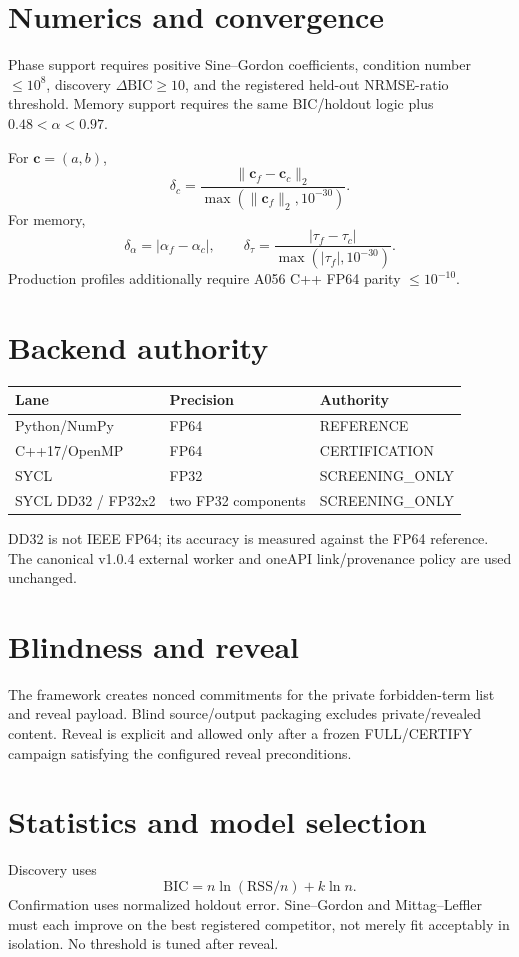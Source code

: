 \documentclass[11pt,a4paper]{article}
\begin{document}
\section{Numerics and convergence}
Phase support requires positive Sine--Gordon coefficients, condition number $\le 10^8$, discovery $\Delta\mathrm{BIC}\ge10$, and the registered held-out NRMSE-ratio threshold. Memory support requires the same BIC/holdout logic plus $0.48<\alpha<0.97$.

For $\mathbf c=(a,b)$,
\[
\delta_c=\frac{\|\mathbf c_f-\mathbf c_c\|_2}{\max(\|\mathbf c_f\|_2,10^{-30})}.
\]
For memory,
\[
\delta_\alpha=|\alpha_f-\alpha_c|,\qquad
\delta_\tau=\frac{|\tau_f-\tau_c|}{\max(|\tau_f|,10^{-30})}.
\]
Production profiles additionally require A056 C++ FP64 parity $\le10^{-10}$.

\section{Backend authority}
\begin{longtable}{lll}\toprule Lane & Precision & Authority\\\midrule
Python/NumPy & FP64 & REFERENCE\\
C++17/OpenMP & FP64 & CERTIFICATION\\
SYCL & FP32 & SCREENING\_ONLY\\
SYCL DD32 / FP32x2 & two FP32 components & SCREENING\_ONLY\\\bottomrule\end{longtable}
DD32 is not IEEE FP64; its accuracy is measured against the FP64 reference. The canonical v1.0.4 external worker and oneAPI link/provenance policy are used unchanged.

\section{Blindness and reveal}
The framework creates nonced commitments for the private forbidden-term list and reveal payload. Blind source/output packaging excludes private/revealed content. Reveal is explicit and allowed only after a frozen FULL/CERTIFY campaign satisfying the configured reveal preconditions.

\section{Statistics and model selection}
Discovery uses
\[
\mathrm{BIC}=n\ln(\mathrm{RSS}/n)+k\ln n.
\]
Confirmation uses normalized holdout error. Sine--Gordon and Mittag--Leffler must each improve on the best registered competitor, not merely fit acceptably in isolation. No threshold is tuned after reveal.
\end{document}
